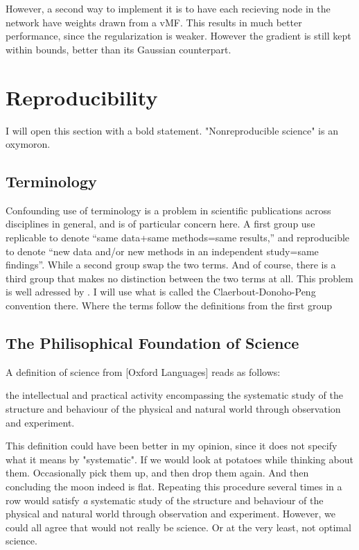 \documentclass[nofootinbib,UKenglish,nobalancelastpage,12pt]{article}
\begin{document}
However, a second way to implement it is to have each recieving node in the network have weights drawn from a vMF. This results in much better performance, since the regularization is weaker. However the gradient is still kept within bounds, better than its Gaussian counterpart.
\clearpage

\section{Reproducibility}

I will open this section with a bold statement. "Nonreproducible science" is an oxymoron. 

\subsection{Terminology}

Confounding use of terminology is a problem in scientific publications across disciplines in general, and is of particular concern here.
A first group use replicable to denote  “same data+same methods=same results,” and reproducible to denote “new data and/or new methods in an independent study=same findings”. While a second group swap the two terms. And of course, there is a third group that makes no distinction between the two terms at all. This problem is well adressed by \cite{Barba_2018}. I will use what is  called the Claerbout-Donoho-Peng convention there. Where the terms follow the definitions from the first group

\subsection{The Philisophical Foundation of Science}

A definition of science from [Oxford Languages] reads as follows:

the intellectual and practical activity encompassing the systematic study of the structure and behaviour of the physical and natural world through observation and experiment. 

This definition could have been better in my opinion, since it does not specify what it means by "systematic". If we would look at potatoes while thinking about them. Occasionally pick them up, and then drop them again. And then concluding the moon indeed is flat. Repeating this procedure several times in a row would satisfy \textit{a} systematic study of the structure and behaviour of the physical and natural world through observation and experiment. However, we could all agree that would not really be science. Or at the very least, not optimal science.
\end{document}
